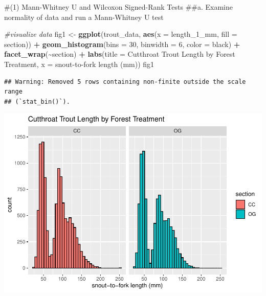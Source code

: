 \documentclass[
]{article}
\newenvironment{Shaded}{\begin{snugshade}}{\end{snugshade}}
\newcommand{\AttributeTok}[1]{\textcolor[rgb]{0.13,0.29,0.53}{#1}}
\newcommand{\CommentTok}[1]{\textcolor[rgb]{0.56,0.35,0.01}{\textit{#1}}}
\newcommand{\DecValTok}[1]{\textcolor[rgb]{0.00,0.00,0.81}{#1}}
\newcommand{\FunctionTok}[1]{\textcolor[rgb]{0.13,0.29,0.53}{\textbf{#1}}}
\newcommand{\NormalTok}[1]{#1}
\newcommand{\OtherTok}[1]{\textcolor[rgb]{0.56,0.35,0.01}{#1}}
\newcommand{\SpecialCharTok}[1]{\textcolor[rgb]{0.81,0.36,0.00}{\textbf{#1}}}
\newcommand{\StringTok}[1]{\textcolor[rgb]{0.31,0.60,0.02}{#1}}
\begin{document}
\#(1) Mann-Whitney U and Wilcoxon Signed-Rank Tests \#\#a. Examine
normality of data and run a Mann-Whitney U test

\begin{Shaded}
\begin{Highlighting}[]
\CommentTok{\#visualize data}
\NormalTok{fig1 }\OtherTok{\textless{}{-}} \FunctionTok{ggplot}\NormalTok{(trout\_data, }\FunctionTok{aes}\NormalTok{(}\AttributeTok{x =}\NormalTok{ length\_1\_mm, }\AttributeTok{fill =}\NormalTok{ section)) }\SpecialCharTok{+}
  \FunctionTok{geom\_histogram}\NormalTok{(}\AttributeTok{bins =} \DecValTok{30}\NormalTok{, }\AttributeTok{binwidth =} \DecValTok{6}\NormalTok{, }\AttributeTok{color =} \StringTok{\textquotesingle{}black\textquotesingle{}}\NormalTok{) }\SpecialCharTok{+}
  \FunctionTok{facet\_wrap}\NormalTok{(}\SpecialCharTok{\textasciitilde{}}\NormalTok{section) }\SpecialCharTok{+}
  \FunctionTok{labs}\NormalTok{(}\AttributeTok{title =} \StringTok{\textquotesingle{}Cutthroat Trout Length by Forest Treatment\textquotesingle{}}\NormalTok{, }
       \AttributeTok{x =} \StringTok{\textquotesingle{}snout{-}to{-}fork length (mm)\textquotesingle{}}\NormalTok{)}
\NormalTok{fig1}
\end{Highlighting}
\end{Shaded}

\begin{verbatim}
## Warning: Removed 5 rows containing non-finite outside the scale range
## (`stat_bin()`).
\end{verbatim}

\includegraphics{Lab7_Summer.Heschong_files/figure-latex/MannWhitney U Test-1.pdf}
\end{document}
